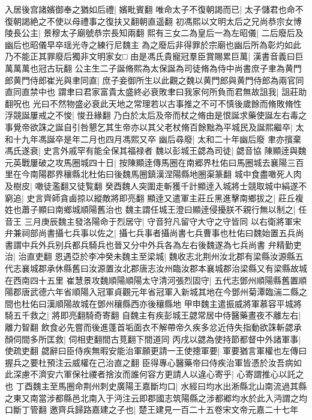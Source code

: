 入居後宫諸嬪御奉之猶如后禮|{
	嬪毗賓翻}
唯命太子不復朝謁而已|{
	太子儲君也命不復朝謁絶之不使以母禮事之復扶又翻朝直遥翻}
初馮熙以文明太后之兄尚恭宗女博陵長公主|{
	景穆太子廟號恭宗長知兩翻}
熙有三女二為皇后一為左昭儀|{
	二后廢后及幽后也昭儀早卒瑶光寺之練行尼魏主為之廢后非得罪於宗廟也幽后所為彰灼如此乃不能正其罪廢后獨非文明家女□}
由是馮氏貴寵冠羣臣賞賜累巨萬|{
	漢書音義曰巨萬萬萬也冠古玩翻}
公主生二子誕脩熙為太保誕為司徒脩為侍中尚書庶子聿為黄門郎黄門侍郎崔光與聿同直|{
	庶子妾御所生以此觀之魏以黄門郎與黄門侍郎為兩官同直同直禁中也}
謂聿曰君家富貴太盛終必衰敗聿曰我家何所負而君無故詛我|{
	詛莊助翻呪也}
光曰不然物盛必衰此天地之常理若以古事推之不可不慎後歲餘而脩敗脩性浮競誕屢戒之不悛|{
	悛丑緣翻}
乃白於太后及帝而杖之脩由是恨誕求藥使誕左右毒之事覺帝欲誅之誕自引咎懇乞其生帝亦以其父老杖脩百餘黜為平城民及誕熙繼卒|{
	太和十九年馮誕卒是年二月也四月馮熙又卒}
幽后尋廢|{
	太和二十年幽后廢}
聿亦擯棄馮氏遂衰|{
	史言外戚罕有能全保其福禄者}
魏以彭城王勰為司徒|{
	勰音協}
陳顯逹與魏元英戰屢破之攻馬圈城四十日|{
	按陳顯逹傳馬圈在南郷界杜佑曰馬圈城去襄陽三百里在今南陽郡界穰縣北杜佑曰後魏馬圈鎮漢涅陽縣地圈渠篆翻}
城中食盡噉死人肉及樹皮|{
	噉徒濫翻又徒覧翻}
癸酉魏人突圍走斬獲千計顯逹入城將士競取城中絹遂不窮追|{
	史言齊師貪鹵掠以縱敵將即亮翻}
顯逹又遣軍主莊丘黑進擊南鄉拔之|{
	莊丘複姓也蕭子顯曰南鄉城順陽舊治也}
魏主謂任城王澄曰顯逹侵擾朕不親行無以制之|{
	任音王}
三月庚辰魏主發洛陽命于烈居守|{
	守音狩凡留守大守之守皆同}
以右衛將軍宋弁兼祠部尚書攝七兵事以佐之|{
	攝七兵事者攝尚書七兵曹事也杜佑曰魏始置五兵尚書謂中兵外兵别兵都兵騎兵也晉又分中外兵各為左右後魏遂為七兵尚書}
弁精勤吏治|{
	治直吏翻}
恩遇亞於李冲癸未魏主至梁城|{
	魏收志北荆州汝北郡有梁縣汝源縣五代志襄城郡承休縣舊曰汝源置汝北郡唐志汝州臨汝郡本襄城郡治梁縣又有梁縣故城在西南四十五里}
崔慧景攻魏順陽順陽太守清河張烈固守|{
	五代志鄧州順陽縣舊置順陽郡唐武德六年省順陽入冠軍貞觀元年省冠軍入新城其地在今鄧州菊潭臨湍二縣之間也杜佑曰漢順陽故城在鄧州穰縣西亦後穰縣地}
甲申魏主遣振威將軍慕容平城將騎五千救之|{
	將即亮翻騎奇寄翻}
自魏主有疾彭城王勰常居中侍醫藥晝夜不離左右|{
	離力智翻}
飲食必先嘗而後進蓬首垢面衣不解帶帝久疾多忿近侍失指動欲誅斬勰承顏伺間多所匡救|{
	伺相吏翻間古莧翻下間道同}
丙戌以勰為使持節都督中外諸軍事|{
	使疏吏翻}
勰辭曰臣侍疾無暇安能治軍願更請一王使摠軍要|{
	軍要猶言軍權也左傳曰握兵之要杜預注云威權在己治直之翻}
臣得專心醫藥帝曰侍疾治軍皆憑於汝吾病如此深慮不濟安六軍保社禝者捨汝而誰何容方更請人以違心寄乎|{
	心寄謂推心以託之也}
丁酉魏主至馬圈命荆州刺史廣陽王嘉斷均口|{
	水經曰均水出淅縣北山南流過其縣之東又南當涉都縣邑北南入于沔注云即郡國志筑陽縣之涉都郷均水於此入沔謂之均口斷丁管翻}
邀齊兵歸路嘉建之子也|{
	楚王建見一百二十五卷宋文帝元嘉二十七年}
